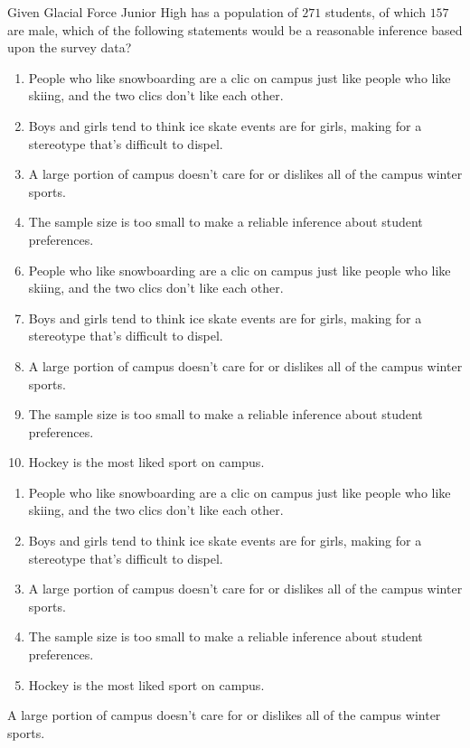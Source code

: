 Given Glacial Force Junior High has a population of $271$ students, of which $157$ are male, which of the following statements would be a reasonable inference based upon the survey data?


\ifsat
	\begin{enumerate}[label=\Alph*)]
		\item People who like snowboarding are a clic on campus just like people who like skiing, and the two clics don't like each other.
		\item Boys and girls tend to think ice skate events are for girls, making for a stereotype that's difficult to dispel.
		\item A large portion of campus doesn't care for or dislikes all of the campus winter sports. %
		\item The sample size is too small to make a reliable inference about student preferences.  
	\end{enumerate}
\else
\fi

\ifacteven
	\begin{enumerate}[label=\textbf{\Alph*.},itemsep=\fill,align=left]
		\setcounter{enumii}{5}
		\item People who like snowboarding are a clic on campus just like people who like skiing, and the two clics don't like each other.
		\item Boys and girls tend to think ice skate events are for girls, making for a stereotype that's difficult to dispel.
		\item A large portion of campus doesn't care for or dislikes all of the campus winter sports. %
		\addtocounter{enumii}{1}
		\item The sample size is too small to make a reliable inference about student preferences.  
		\item Hockey is the most liked sport on campus.
	\end{enumerate}
\else
\fi

\ifactodd
	\begin{enumerate}[label=\textbf{\Alph*.},itemsep=\fill,align=left]
		\item People who like snowboarding are a clic on campus just like people who like skiing, and the two clics don't like each other.
		\item Boys and girls tend to think ice skate events are for girls, making for a stereotype that's difficult to dispel.
		\item A large portion of campus doesn't care for or dislikes all of the campus winter sports. %
		\item The sample size is too small to make a reliable inference about student preferences.  
		\item Hockey is the most liked sport on campus.
	\end{enumerate}
\else
\fi

\ifgridin
 A large portion of campus doesn't care for or dislikes all of the campus winter sports. %
		
\else
\fi

